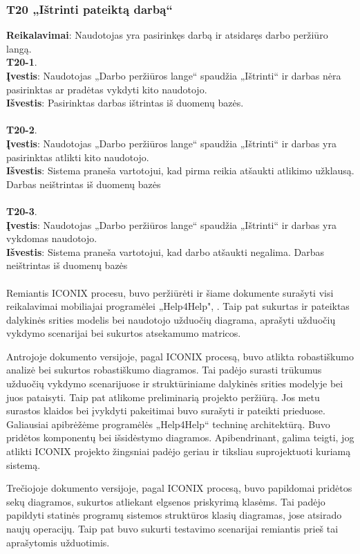 \documentclass{VUMIFPSbakalaurinis}
\begin{document}
\subsubsection{T20 „Ištrinti pateiktą darbą“}
\textbf{Reikalavimai}: Naudotojas yra pasirinkęs darbą ir atsidaręs darbo peržiūro langą. \\
\textbf{T20-1}. \\
\textbf{Įvestis}: Naudotojas „Darbo peržiūros lange“ spaudžia „Ištrinti“ ir darbas nėra pasirinktas ar pradėtas vykdyti kito naudotojo. \\
\textbf{Išvestis}: Pasirinktas darbas ištrintas iš duomenų bazės. \\ \\
\textbf{T20-2}. \\
\textbf{Įvestis}: Naudotojas „Darbo peržiūros lange“ spaudžia „Ištrinti“ ir darbas yra pasirinktas atlikti kito naudotojo. \\
\textbf{Išvestis}: Sistema praneša vartotojui, kad pirma reikia atšaukti atlikimo užklausą. Darbas neištrintas iš duomenų bazės\\ \\
\textbf{T20-3}. \\
\textbf{Įvestis}: Naudotojas „Darbo peržiūros lange“ spaudžia „Ištrinti“ ir darbas yra vykdomas naudotojo. \\
\textbf{Išvestis}: Sistema praneša vartotojui, kad darbo atšaukti negalima. Darbas neištrintas iš duomenų bazės\\ \\

Remiantis ICONIX procesu, buvo peržiūrėti ir šiame dokumente surašyti visi reikalavimai mobiliajai programėlei „Help4Help", . Taip pat sukurtas ir pateiktas dalykinės srities modelis bei naudotojo užduočių diagrama, aprašyti užduočių vykdymo scenarijai bei sukurtos atsekamumo matricos.
\par Antrojoje dokumento versijoje, pagal ICONIX procesą, buvo atlikta robastiškumo analizė bei sukurtos robastiškumo diagramos. Tai padėjo surasti trūkumus užduočių vykdymo scenarijuose ir struktūriniame dalykinės srities modelyje bei juos pataisyti. Taip pat atlikome preliminarią projekto peržiūrą. Jos metu surastos klaidos bei įvykdyti pakeitimai buvo surašyti ir pateikti prieduose. Galiausiai apibrėžėme programėlės „Help4Help“ techninę architektūrą. Buvo pridėtos komponentų bei išsidėstymo diagramos. Apibendrinant, galima teigti, jog atlikti ICONIX projekto žingsniai padėjo geriau ir tiksliau suprojektuoti kuriamą sistemą.
\par Trečiojoje dokumento versijoje, pagal ICONIX procesą, buvo papildomai pridėtos sekų diagramos, sukurtos atliekant elgsenos priskyrimą klasėms. Tai padėjo papildyti statinės programų sistemos struktūros klasių diagramas, jose atsirado naujų operacijų. Taip pat buvo sukurti testavimo scenarijai remiantis prieš tai aprašytomis užduotimis.
\end{document}
